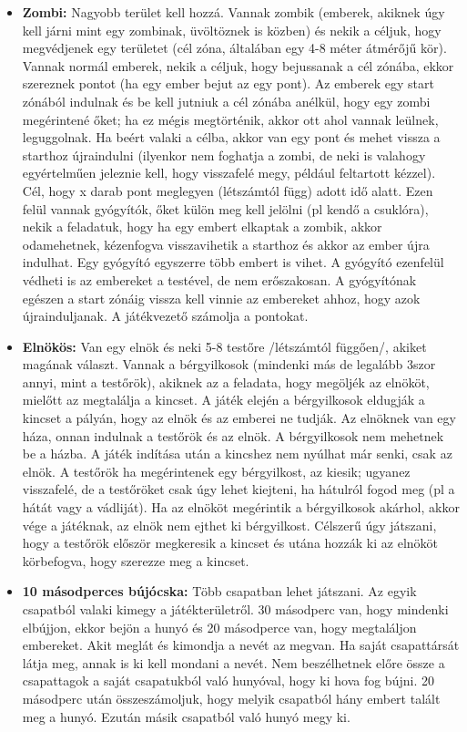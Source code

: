\documentclass[a4paper, 12pt, twoside, openright]{article}
\begin{document}
\begin{itemize}
\item \textbf{Zombi:} Nagyobb terület kell hozzá. Vannak zombik (emberek, akiknek úgy kell járni mint egy zombinak, üvöltöznek is közben) és nekik a céljuk, hogy megvédjenek egy területet (cél zóna, általában egy 4-8 méter átmérőjű kör). Vannak normál emberek, nekik a céljuk, hogy bejussanak a cél zónába, ekkor szereznek pontot (ha egy ember bejut az egy pont). Az emberek egy start zónából indulnak és be kell jutniuk a cél zónába anélkül, hogy egy zombi megérintené őket; ha ez mégis megtörténik, akkor ott ahol vannak leülnek, leguggolnak. Ha beért valaki a célba, akkor van egy pont és mehet vissza a starthoz újraindulni (ilyenkor nem foghatja a zombi, de neki is valahogy egyértelműen jeleznie kell, hogy visszafelé megy, például feltartott kézzel). Cél, hogy x darab pont meglegyen (létszámtól függ) adott idő alatt. Ezen felül vannak gyógyítók, őket külön meg kell jelölni (pl kendő a csuklóra), nekik a feladatuk, hogy ha egy embert elkaptak a zombik, akkor odamehetnek, kézenfogva visszavihetik a starthoz és akkor az ember újra indulhat. Egy gyógyító egyszerre több embert is vihet. A gyógyító ezenfelül védheti is az embereket a testével, de nem erőszakosan. A gyógyítónak egészen a start zónáig vissza kell vinnie az embereket ahhoz, hogy azok újrainduljanak. A játékvezető számolja a pontokat.

\item \textbf{Elnökös:} Van egy elnök és neki 5-8 testőre /létszámtól függően/, akiket magának választ. Vannak a bérgyilkosok (mindenki más de legalább 3szor annyi, mint a testőrök), akiknek az a feladata, hogy megöljék az elnököt, mielőtt az megtalálja a kincset. A játék elején a bérgyilkosok eldugják a kincset a pályán, hogy az elnök és az emberei ne tudják. Az elnöknek van egy háza, onnan indulnak a testőrök és az elnök. A bérgyilkosok nem mehetnek be a házba. A játék indítása után a kincshez nem nyúlhat már senki, csak az elnök. A testőrök ha megérintenek egy bérgyilkost, az kiesik; ugyanez visszafelé, de a testőröket csak úgy lehet kiejteni, ha hátulról fogod meg (pl a hátát vagy a vádliját). Ha az elnököt megérintik a bérgyilkosok akárhol, akkor vége a játéknak, az elnök nem ejthet ki bérgyilkost. Célszerű úgy játszani, hogy a testőrök először megkeresik a kincset és utána hozzák ki az elnököt körbefogva, hogy szerezze meg a kincset.

\item \textbf{10 másodperces bújócska:} Több csapatban lehet játszani. Az egyik csapatból valaki kimegy a játékterületről. 30 másodperc van, hogy mindenki elbújjon, ekkor bejön a hunyó és 20 másodperce van, hogy megtaláljon embereket. Akit meglát és kimondja a nevét az megvan. Ha saját csapattársát látja meg, annak is ki kell mondani a nevét. Nem beszélhetnek előre össze a csapattagok a saját csapatukból való hunyóval, hogy ki hova fog bújni. 20 másodperc után összeszámoljuk, hogy melyik csapatból hány embert talált meg a hunyó. Ezután másik csapatból való hunyó megy ki. 


\end{itemize}
\end{document}
